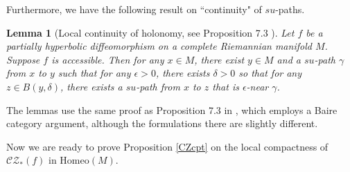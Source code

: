 \documentclass[11pt]{amsart}
\numberwithin{equation}{section}
\newcommand{\CZ}{\mathcal{CZ}}
\theoremstyle{plain}
\newtheorem{lem}[thm]{Lemma}
\begin{document}
Furthermore, we have the following result on ``continuity" of $su$-paths.

\begin{lem}[Local continuity of holonomy, see Proposition 7.3 \cite{ASV}]\label{ctshol}
Let $f$ be a partially hyperbolic diffeomorphism on a complete Riemannian manifold $M$. Suppose $f$ is accessible. Then for any $x\in M$, there exist $y\in M$ and a $su$-path $\gamma$ from $x$ to $y$ such that for any $\epsilon>0$, there exists $\delta>0$ so that for any $z\in B(y,\delta)$, there exists a $su$-path from $x$ to $z$ that is $\epsilon$-near $\gamma$.
\end{lem}

The lemmas use the same proof as Proposition 7.3 in \cite{ASV}, which employs a Baire category argument, although the formulations there are slightly different.

Now we are ready to prove Proposition \ref{CZcpt} on the local compactness of $\CZ_*(f)$ in $\mathrm{Homeo}(M)$.
\end{document}
